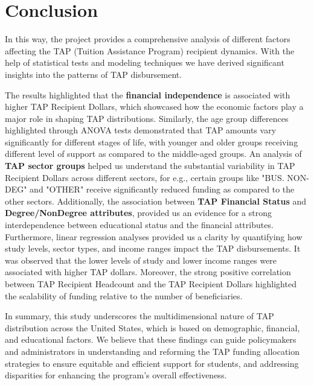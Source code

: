 \documentclass[sigconf]{acmart}
\begin{document}
\section{Conclusion}
In this way, the project provides a comprehensive analysis of different factors affecting the TAP (Tuition Assistance Program) recipient dynamics. With the help of statistical tests and modeling techniques we have derived significant insights into the patterns of TAP disbursement. 

The results highlighted that the \textbf{financial independence} is associated with higher TAP Recipient Dollars, which showcased how the economic factors play a major role in shaping TAP distributions. Similarly, the age group differences highlighted through ANOVA tests demonstrated that TAP amounts vary significantly for different stages of life, with younger and older groups receiving different level of support as compared to the middle-aged groups. An analysis of \textbf{TAP sector groups} helped us understand the substantial variability in TAP Recipient Dollars across different sectors, for e.g., certain groups like "BUS. NON-DEG" and "OTHER" receive significantly reduced funding as compared to the other sectors. Additionally, the association between \textbf{TAP Financial Status} and \textbf{Degree/NonDegree attributes}, provided us an evidence for a strong interdependence between educational status and the financial attributes. Furthermore, linear regression analyses provided us a clarity by quantifying how study levels, sector types, and income ranges impact the TAP disbursements. It was observed that the lower levels of study and lower income ranges were associated with higher TAP dollars. Moreover, the strong positive correlation between TAP Recipient Headcount and the TAP Recipient Dollars highlighted the scalability of funding relative to the number of beneficiaries.

In summary, this study underscores the multidimensional nature of TAP distribution across the United States, which is based on demographic, financial, and educational factors. We believe that these findings can guide policymakers and administrators in understanding and reforming the TAP funding allocation strategies to ensure equitable and efficient support for students, and addressing disparities for enhancing the program's overall effectiveness.



\nocite{*}



\end{document}

